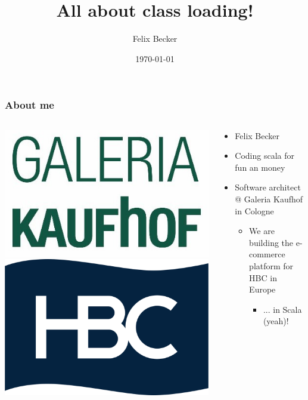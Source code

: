 \documentclass[aspectratio=169]{beamer}
\title{All about class loading!}
\author{Felix Becker}
\date{\today}
\institute{Amsterdam.scala}
\begin{document}
\maketitle

\begin{frame}
	\frametitle{About me}
	\begin{columns}[T] 
		\begin{column}{.20\textwidth}
			\includegraphics[scale=0.16]{assets/kaufhof}
			\\
			\includegraphics[scale=0.06]{assets/hbc}
		\end{column}
		\hfill
		\begin{column}{.80\textwidth}
			\begin{itemize}
				\item{Felix Becker}
				\item{Coding scala for fun an money}
				\item{Software architect @ Galeria Kaufhof in Cologne}
				\begin{itemize}
					\item{We are building the e-commerce platform for HBC in Europe}
					\begin{itemize}
						\item{... in Scala (yeah)!}
					\end{itemize}
				\end{itemize}
			\end{itemize}
		\end{column}
	\end{columns}
\end{frame}
\end{document}

